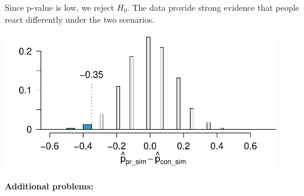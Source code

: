 \documentclass[11pt]{article}
\begin{document}
\begin{enumerate}
\begin{enumerate}[(a)]
\noindent \begin{minipage}[c]{0.5\textwidth}
Since p-value is low, we reject $H_0$. The data provide strong evidence that people react differently under the two scenarios.
\end{minipage}
\begin{minipage}[c]{0.5\textwidth}
\begin{center}
\includegraphics[width= 0.9\textwidth]{figures/socExpSoln}
\end{center}
\end{minipage}
\end{enumerate}

\end{enumerate}

%

\pagebreak

\textbf{Additional problems:}
\end{document}
